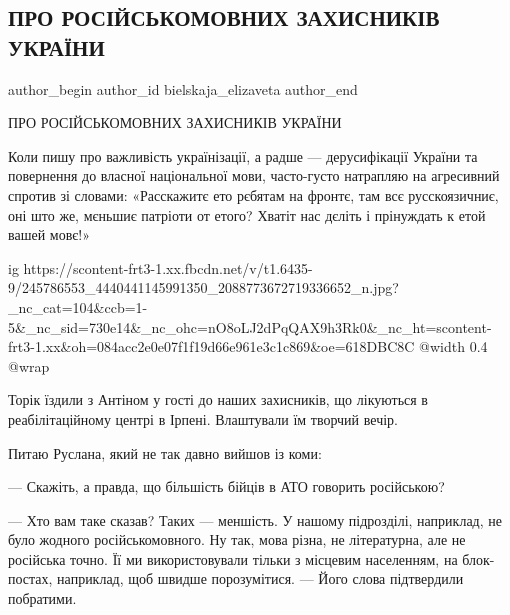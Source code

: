  
 
 
 
 
 
\subsection{ПРО РОСІЙСЬКОМОВНИХ ЗАХИСНИКІВ УКРАЇНИ}
\label{sec:14_10_2021.fb.bielskaja_elizaveta.1.jazyk_zaschitniki_ukrainy}
 
\ifcmt
 author_begin
   author_id bielskaja_elizaveta
 author_end
\fi

ПРО РОСІЙСЬКОМОВНИХ ЗАХИСНИКІВ УКРАЇНИ

Коли пишу про важливість українізації, а радше — дерусифікації України та
повернення до власної національної мови, часто-густо натрапляю на агресивний
спротив зі словами: «Расскажитє ето рєбятам на фронтє, там всє русскоязичниє,
оні што же, мєньшиє патріоти от етого? Хватіт нас дєліть і прінуждать к етой
вашей мовє!»

\ifcmt
  ig https://scontent-frt3-1.xx.fbcdn.net/v/t1.6435-9/245786553_4440441145991350_2088773672719336652_n.jpg?_nc_cat=104&ccb=1-5&_nc_sid=730e14&_nc_ohc=nO8oLJ2dPqQAX9h3Rk0&_nc_ht=scontent-frt3-1.xx&oh=084acc2e0e07f1f19d66e961e3c1c869&oe=618DBC8C
  @width 0.4
  @wrap 
\fi

Торік їздили з Антіном у гості до наших захисників, що лікуються в
реабілітаційному центрі в Ірпені. Влаштували їм творчий вечір.

Питаю Руслана, який не так давно вийшов із коми:

— Скажіть, а правда, що більшість бійців в АТО говорить російською?

— Хто вам таке сказав? Таких — меншість. У нашому підрозділі, наприклад, не
було жодного російськомовного. Ну так, мова різна, не літературна, але не
російська точно. Її ми використовували тільки з місцевим населенням, на
блок-постах, наприклад, щоб швидше порозумітися. — Його слова підтвердили
побратими.


